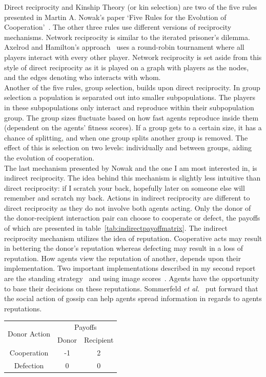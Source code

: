 \documentclass[]{final_report}
\begin{document}
Direct reciprocity and Kinship Theory (or kin selection) are two of the five rules presented in Martin A. Nowak's paper `Five Rules for the Evolution of Cooperation'~\cite{five_rules_coop}. The other three rules use different versions of reciprocity mechanisms. Network reciprocity is similar to the iterated prisoner's dilemma. Axelrod and Hamilton's approach~\cite{evolution_of_cooperation} uses a round-robin tournament where all players interact with every other player. Network reciprocity is set aside from this style of direct reciprocity as it is played on a graph with players as the nodes, and the edges denoting who interacts with whom.\\
Another of the five rules, group selection, builds upon direct reciprocity. In group selection a population is separated out into smaller subpopulations. The players in these subpopulations only interact and reproduce within their subpopulation group. The group sizes fluctuate based on how fast agents reproduce inside them (dependent on the agents' fitness scores). If a group gets to a certain size, it has a chance of splitting, and when one group splits another group is removed. The effect of this is selection on two levels: individually and between groups, aiding the evolution of cooperation.\\
The last mechanism presented by Nowak and the one I am most interested in, is indirect reciprocity. The idea behind this mechanism is slightly less intuitive than direct reciprocity: if I scratch your back, hopefully later on someone else will remember and scratch my back. Actions in indirect reciprocity are different to direct reciprocity as they do not involve both agents acting. Only the donor of the donor-recipient interaction pair can choose to cooperate or defect, the payoffs of which are presented in table~\ref{tab:indirectpayoffmatrix}.
The indirect reciprocity mechanism utilizes the idea of reputation. Cooperative acts may result in bettering the donor's reputation whereas defecting may result in a loss of reputation. How agents view the reputation of another, depends upon their implementation. Two important implementations described in my second report are the standing strategy~\cite{leimarhammer} and using image scores~\cite{evol_indirect_image}. Agents have the opportunity to base their decisions on these reputations. Sommerfeld \textit{et al.}~\cite{gossip_alt} put forward that the social action of gossip can help agents spread information in regards to agents reputations.
\begin{framed}
	\begin{center}
		\begin{tabular}{c|c|c}
		\multirow{2}{*}{Donor Action} & \multicolumn{2}{c}{Payoffs}\\		
		& Donor & Recipient\\
		\hline
		Cooperation & -1 & 2\\
		\hline
		Defection & 0 & 0\\
		\end{tabular}
		\label{tab:indirectpayoffmatrix}
	\end{center}	
\end{framed}
\end{document}
